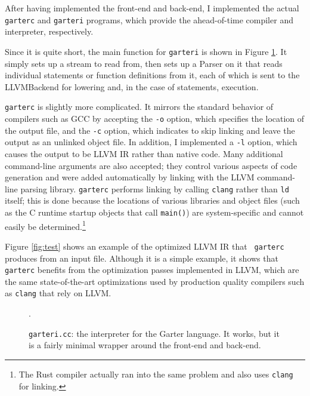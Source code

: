 \documentclass[11pt]{article}
\begin{document}
After having implemented the front-end and back-end, I implemented the actual
{\tt garterc} and {\tt garteri} programs, which provide the ahead-of-time
compiler and interpreter, respectively.

Since it is quite short, the main function for {\tt garteri} is shown in Figure
\ref{fig:garteri}.  It simply sets up a stream to read from, then sets up a
Parser on it that reads individual statements or function definitions from it,
each of which is sent to the LLVMBackend for lowering and, in the case of
statements, execution.

{\tt garterc} is slightly more complicated.  It mirrors the standard behavior of
compilers such as GCC by accepting the {\tt -o} option, which specifies the
location of the output file, and the {\tt -c} option, which indicates to skip
linking and leave the output as an unlinked object file.  In addition, I
implemented a {\tt -l} option, which causes the output to be LLVM IR rather than
native code.  Many additional command-line arguments are also accepted; they
control various aspects of code generation and were added automatically by
linking with the LLVM command-line parsing library.  {\tt garterc} performs
linking by calling {\tt clang} rather than {\tt ld} itself; this is done because
the locations of various libraries and object files (such as the C runtime
startup objects that call {\tt main()}) are system-specific and cannot easily be
determined.\footnote{The Rust compiler\cite{rust} actually ran into the same
    problem and also uses {\tt clang} for linking.}

Figure \ref{fig:test} shows an example of the optimized LLVM IR that {\tt
garterc} produces from an input file.  Although it is a simple example, it shows
that {\tt garterc} benefits from the optimization passes implemented in LLVM,
which are the same state-of-the-art optimizations used by production quality
compilers such as {\tt clang} that rely on LLVM.

\begin{figure}
    \lstset{language=C++}
    \lstset{numbers=left}
    
    \caption{{\tt garteri.cc}:  the interpreter for the Garter language.  It
        works, but it is a fairly minimal wrapper around the front-end and
    back-end.}
    \label{fig:garteri}.
\end{figure}
\end{document}
